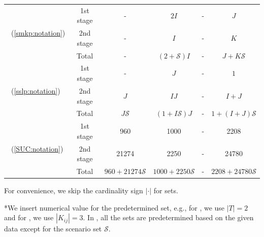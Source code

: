 \begin{table}[H]
{\begin{threeparttable}
\begin{tabular}{@{}lccccc@{}}
				\multirow{3}{*}{\smkp\ (\ref{smkp:notation})}   & 1st stage & -              & $2I$                               & -                    & $J$                       \\
				& 2nd stage & -              & $I$                                & -                    & $K$                       \\ \cmidrule(l){2-6} 
				& Total          & -              & $(2+\mathcal{S})I$                 & -                    & $J+K\mathcal{S}$          \\ \midrule
				\multirow{3}{*}{\sslp\ (\ref{sslp:notation})}   & 1st stage & -              & $J$                                & -                    & $1$                       \\
				& 2nd stage & $J$            & $IJ$                               & -                    & $I+J$                     \\ \cmidrule(l){2-6} 
				& Total          & $J\mathcal{S}$ & $(1+I\mathcal{S})J$                & -                    & $1+(I+J)\mathcal{S}$      \\ \midrule
				\multirow{3}{*}{\suc\ (\ref{SUC:notation})}   & 1st stage & 960               &   1000                                 &     -                 &  2208                         \\
				& 2nd stage & 21274               &     2250                               &   -                   & 24780                          \\ \cmidrule(l){2-6} 
				& Total          & $960+21274\mathcal{S}$                &  $1000+2250\mathcal{S}$                                  &  -                    &  $2208+24780\mathcal{S}$                         \\ \bottomrule
			\end{tabular}
			
			\begin{tablenotes}
				\small
				\item *For convenience, we skip the cardinality sign $|\cdot|$ for sets.
				\item **We insert numerical value for the predetermined set, e.g., for \sizes, we use $|T|=2$ and for \mptsps, we use $|K_{ij}|=3$. In \suc, all the sets are predetermined based on the given data except for the scenario set $\mathcal{S}$.
			\end{tablenotes}
		\end{threeparttable}
	}
\end{table}

